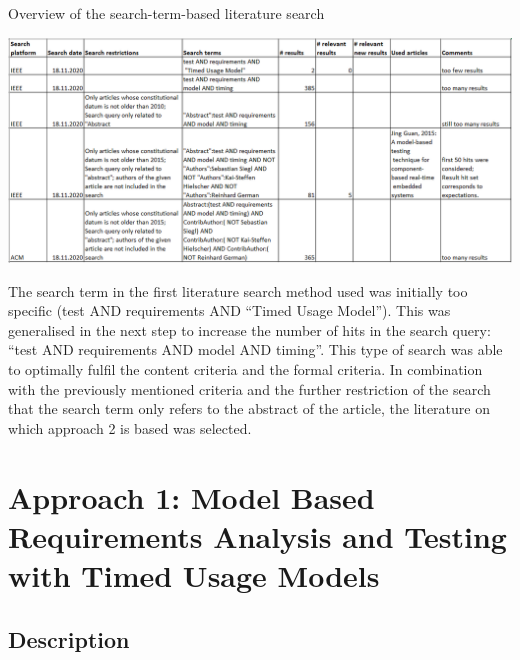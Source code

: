 \begin{table}[h]
	\centering
	\caption{Overview of the search-term-based literature search}
	\includegraphics[scale=0.8]{../images/SearchTermTable} 
\end{table}
The search term in the first literature search method used was initially
too specific (test AND requirements AND \enquote{Timed Usage
Model}). This was generalised in the next step to increase
the number of hits in the search query: \enquote{test AND requirements
AND model AND timing}. This type of search was able to
optimally fulfil the content criteria and the formal criteria. In
combination with the previously mentioned criteria and the further
restriction of the search that the search term only refers to the
abstract of the article, the literature on which approach 2 is based
was selected.

\section{Approach 1: Model Based Requirements Analysis and Testing with Timed
Usage Models\label{sec:Approach-1}}

\subsection{Description}

